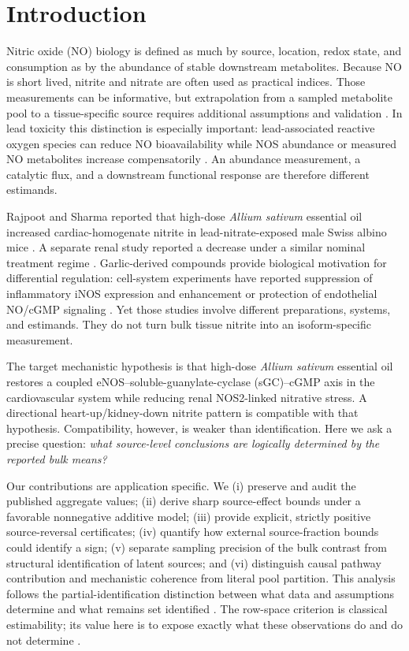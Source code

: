 \documentclass[11pt]{article}
\newcommand{\ASEO}{\textit{Allium sativum} essential oil}
\begin{document}
\section{Introduction}

Nitric oxide (NO) biology is defined as much by source, location, redox state, and consumption as by the abundance of stable downstream metabolites. Because NO is short lived, nitrite and nitrate are often used as practical indices. Those measurements can be informative, but extrapolation from a sampled metabolite pool to a tissue-specific source requires additional assumptions and validation \citep{bryan2007,giustarini2008}. In lead toxicity this distinction is especially important: lead-associated reactive oxygen species can reduce NO bioavailability while NOS abundance or measured NO metabolites increase compensatorily \citep{vaziri1999,vaziri2001,silveira2014}. An abundance measurement, a catalytic flux, and a downstream functional response are therefore different estimands.

Rajpoot and Sharma reported that high-dose \ASEO{} increased cardiac-homogenate nitrite in lead-nitrate-exposed male Swiss albino mice \citep{rajpoot2025}. A separate renal study reported a decrease under a similar nominal treatment regime \citep{sharma2024}. Garlic-derived compounds provide biological motivation for differential regulation: cell-system experiments have reported suppression of inflammatory iNOS expression and enhancement or protection of endothelial NO/cGMP signaling \citep{kim2001,lei2010}. Yet those studies involve different preparations, systems, and estimands. They do not turn bulk tissue nitrite into an isoform-specific measurement.

The target mechanistic hypothesis is that high-dose \ASEO{} restores a coupled eNOS--soluble-guanylate-cyclase (sGC)--cGMP axis in the cardiovascular system while reducing renal NOS2-linked nitrative stress. A directional heart-up/kidney-down nitrite pattern is compatible with that hypothesis. Compatibility, however, is weaker than identification. Here we ask a precise question: \emph{what source-level conclusions are logically determined by the reported bulk means?}

Our contributions are application specific. We (i) preserve and audit the published aggregate values; (ii) derive sharp source-effect bounds under a favorable nonnegative additive model; (iii) provide explicit, strictly positive source-reversal certificates; (iv) quantify how external source-fraction bounds could identify a sign; (v) separate sampling precision of the bulk contrast from structural identification of latent sources; and (vi) distinguish causal pathway contribution and mechanistic coherence from literal pool partition. This analysis follows the partial-identification distinction between what data and assumptions determine and what remains set identified \citep{tamer2010,imbensmanski2004}. The row-space criterion is classical estimability; its value here is to expose exactly what these observations do and do not determine \citep{searle1971}.
\end{document}
